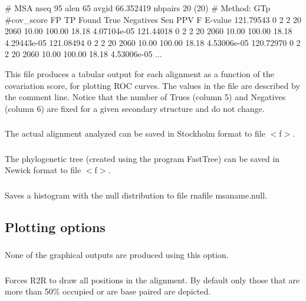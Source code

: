 \begin{sreoutput}
# MSA nseq 95 alen 65 avgid 66.352419 nbpairs 20 (20)
# Method: GTp
#cov_score  FP  TP Found  True  Negatives  Sen   PPV     F       E-value
121.79543   0   2  2      20    2060       10.00 100.00  18.18   4.07104e-05
121.44018   0   2  2      20    2060       10.00 100.00  18.18   4.29443e-05
121.08494   0   2  2      20    2060       10.00 100.00  18.18   4.53006e-05
120.72970   0   2  2      20    2060       10.00 100.00  18.18   4.53006e-05
...
\end{sreoutput}

This file produces a tabular output for each alignment as a function
of the covariation score, for plotting ROC curves. The values in the
file are described by the comment line. Notice that the number of
Trues (column 5) and Negatives (column 6) are fixed for a given
secondary structure and do not change.

\subsubsection{} The actual alignment analyzed can be saved in Stockholm format to file $<$f$>$.

\subsubsection{} The phylogenetic tree (created using the program FastTree) can be saved in Newick format to file $<$f$>$.

\subsubsection{} Saves a histogram with the null distribution to file rnafile msaname.null.

\subsection{Plotting options}

\subsubsection{} None of the graphical outputs are produced using this option.


\subsubsection{} Forces R2R to draw all positions in the alignment. By default only
those that are more than 50\% occupied or are base paired are
depicted.

